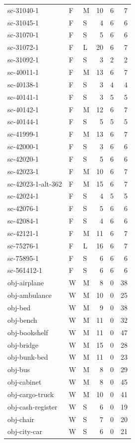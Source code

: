 \begin{longtable}{@{}p{}llrrr@{}}
sc-31040-1 & F & M & 10 & 6 & 7\\
sc-31045-1 & F & S & 4 & 6 & 6\\
sc-31070-1 & F & S & 5 & 6 & 6\\
sc-31072-1 & F & L & 20 & 6 & 7\\
sc-31092-1 & F & S & 3 & 2 & 2\\
sc-40011-1 & F & M & 13 & 6 & 7\\
sc-40138-1 & F & S & 3 & 4 & 4\\
sc-40141-1 & F & S & 3 & 5 & 5\\
sc-40142-1 & F & M & 12 & 6 & 7\\
sc-40144-1 & F & S & 5 & 5 & 5\\
sc-41999-1 & F & M & 13 & 6 & 7\\
sc-42000-1 & F & S & 3 & 6 & 6\\
sc-42020-1 & F & S & 5 & 6 & 6\\
sc-42023-1 & F & M & 10 & 6 & 7\\
sc-42023-1-alt-362 & F & M & 15 & 6 & 7\\
sc-42024-1 & F & S & 4 & 5 & 5\\
sc-42076-1 & F & S & 5 & 6 & 6\\
sc-42084-1 & F & S & 4 & 6 & 6\\
sc-42121-1 & F & M & 11 & 6 & 7\\
sc-75276-1 & F & L & 16 & 6 & 7\\
sc-75895-1 & F & S & 6 & 6 & 6\\
sc-561412-1 & F & S & 6 & 6 & 6\\
obj-airplane & W & M & 8 & 0 & 38\\
obj-ambulance & W & M & 10 & 0 & 25\\
obj-bed & W & M & 9 & 0 & 38\\
obj-bench & W & M & 11 & 0 & 32\\
obj-bookshelf & W & M & 11 & 0 & 47\\
obj-bridge & W & M & 15 & 0 & 28\\
obj-bunk-bed & W & M & 11 & 0 & 23\\
obj-bus & W & M & 8 & 0 & 29\\
obj-cabinet & W & M & 8 & 0 & 45\\
obj-cargo-truck & W & M & 10 & 0 & 41\\
obj-cash-register & W & S & 6 & 0 & 19\\
obj-chair & W & S & 7 & 0 & 20\\
obj-city-car & W & S & 6 & 0 & 21\\

\end{longtable}
